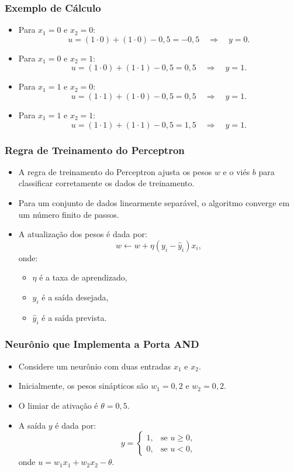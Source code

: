 \documentclass{beamer}
\begin{document}
\begin{frame}
\frametitle{Exemplo de Cálculo}
\begin{itemize}
    \item Para \( x_1 = 0 \) e \( x_2 = 0 \):
    \[
    u = (1 \cdot 0) + (1 \cdot 0) - 0,5 = -0,5 \quad \Rightarrow \quad y = 0.
    \]
    \item Para \( x_1 = 0 \) e \( x_2 = 1 \):
    \[
    u = (1 \cdot 0) + (1 \cdot 1) - 0,5 = 0,5 \quad \Rightarrow \quad y = 1.
    \]
    \item Para \( x_1 = 1 \) e \( x_2 = 0 \):
    \[
    u = (1 \cdot 1) + (1 \cdot 0) - 0,5 = 0,5 \quad \Rightarrow \quad y = 1.
    \]
    \item Para \( x_1 = 1 \) e \( x_2 = 1 \):
    \[
    u = (1 \cdot 1) + (1 \cdot 1) - 0,5 = 1,5 \quad \Rightarrow \quad y = 1.
    \]
\end{itemize}
\end{frame}


\begin{frame}
\frametitle{Regra de Treinamento do Perceptron}
\begin{itemize}
    \item A regra de treinamento do Perceptron ajusta os pesos \( w \) e o viés \( b \) para classificar corretamente os dados de treinamento.
    \item Para um conjunto de dados linearmente separável, o algoritmo converge em um número finito de passos.
    \item A atualização dos pesos é dada por:
    \[
    w \leftarrow w + \eta (y_i - \hat{y}_i) x_i,
    \]
    onde:
    \begin{itemize}
        \item \( \eta \) é a taxa de aprendizado,
        \item \( y_i \) é a saída desejada,
        \item \( \hat{y}_i \) é a saída prevista.
    \end{itemize}
\end{itemize}
\end{frame}


\begin{frame}
\frametitle{Neurônio que Implementa a Porta AND}
\begin{itemize}
    \item Considere um neurônio com duas entradas \( x_1 \) e \( x_2 \).
    \item Inicialmente, os pesos sinápticos são \( w_1 = 0,2 \) e \( w_2 = 0,2 \).
    \item O limiar de ativação é \( \theta = 0,5 \).
    \item A saída \( y \) é dada por:
    \[
    y = \begin{cases}
    1, & \text{se } u \geq 0, \\
    0, & \text{se } u < 0,
    \end{cases}
    \]
    onde \( u = w_1 x_1 + w_2 x_2 - \theta \).
\end{itemize}
\end{frame}
\end{document}
